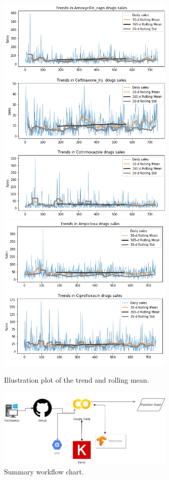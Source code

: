 \documentclass[12pt]{report}
\begin{document}
\begin{figure}[H]%
  \begin {center}
  \includegraphics[width=0.75\textwidth]{images/download (10).png}
  \includegraphics[width=0.75\textwidth]{images/download (12).png}
  \caption{Illustration plot of the trend and rolling mean.}
  \label{fig:ecg}
  \end {center}
\end{figure}


\begin{figure}[H]%
  \begin {center}
  \includegraphics[width=0.75\textwidth]{images/new.png}
  \caption{Summary workflow chart.}
  \label{fig:ecg}
  \end {center}
\end{figure}
\end{document}
